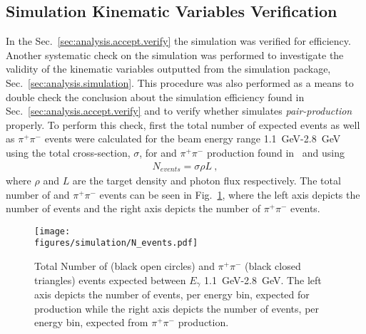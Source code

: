 \subsection{Simulation Kinematic Variables Verification}\label{sec:analysis.simsmear.verify}

In the Sec.~\ref{sec:analysis.accept.verify} the simulation was verified for efficiency. Another systematic check on the simulation was performed to investigate the validity of the kinematic variables outputted from the simulation package, Sec.~\ref{sec:analysis.simulation}. This procedure was also performed as a means to double check the conclusion about the simulation efficiency found in Sec.~\ref{sec:analysis.accept.verify} and to verify whether  simulates \emph{pair-production} properly. To perform this check, first the total number of expected \pizT events as well as $\pi^+\pi^-$ events were calculated for the beam energy range 1.1~GeV-2.8~GeV using the total cross-section, $\sigma$, for \pizT and $\pi^+\pi^-$ production found in~\cite{durham} and using
\begin{align}
N_{events} = \sigma \rho L \ ,
\end{align}
where $\rho$ and $L$ are the target density and photon flux respectively. The total number of \pizT and $\pi^+\pi^-$ events can be seen in Fig.~\ref{fig:simsmear.Ntot}, where the left axis depicts the number of \pizT events and the right axis depicts the number of $\pi^+\pi^-$ events.
\begin{figure}[h!]\begin{center}
		\texttt{[image: \\figures/simulation/N\_events.pdf]}
		\caption[Total Number of \pizT and $\pi^+\pi^-$ Events Expected Between $E_{\gamma}$ 1.1~GeV-2.8~GeV ]{\label{fig:simsmear.Ntot}Total Number of \pizT (black open circles) and $\pi^+\pi^-$ (black closed triangles) events expected between $E_{\gamma}$ 1.1~GeV-2.8~GeV. The left axis depicts the number of events, per energy bin, expected for \pizT production while the right axis depicts the number of events, per energy bin, expected from $\pi^+\pi^-$ production. }
	\end{center}\end{figure} 
	
